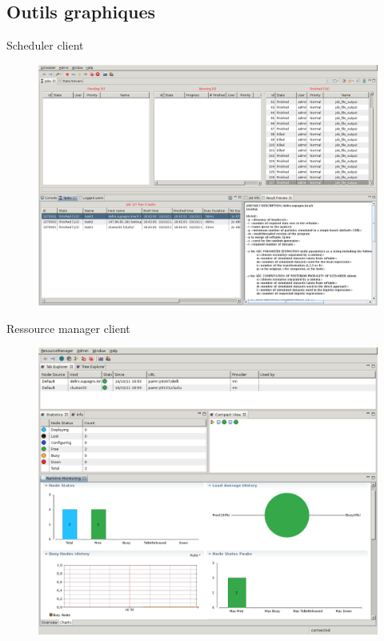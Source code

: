 \documentclass[handout]{beamer}
\begin{document}
\subsection{Outils graphiques}
\begin{frame}{Scheduler client}
    \begin{figure}
        \centering
        \includegraphics[scale=0.18]{sc_sched.png}
    \end{figure}
\end{frame}
\begin{frame}{Ressource manager client}
    \begin{figure}
        \centering
        \includegraphics[scale=0.18]{sc_rmc.png}
    \end{figure}
\end{frame}
\end{document}
